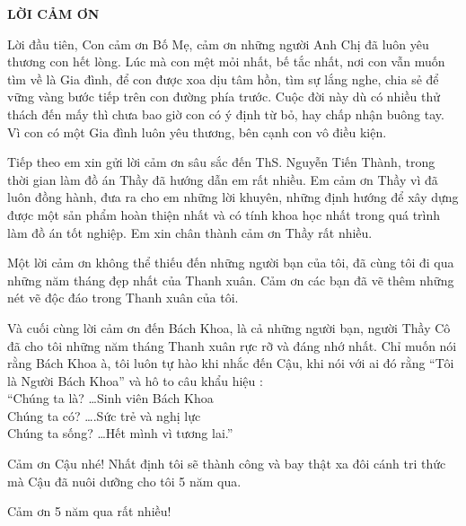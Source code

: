 \documentclass[../DoAn.tex]{subfiles}
\begin{document}
\begin{center}
    \Large{\textbf{LỜI CẢM ƠN}}\\
\end{center}
\vspace{1cm}
Lời đầu tiên, Con cảm ơn Bố Mẹ, cảm ơn những người Anh Chị đã luôn yêu thương con hết lòng. Lúc mà con mệt mỏi nhất, bế tắc nhất, nơi con vẫn muốn tìm về là Gia đình, để con được xoa dịu tâm hồn, tìm sự lắng nghe, chia sẻ để vững vàng bước tiếp trên con đường phía trước. Cuộc đời này dù có nhiều thử thách đến mấy thì chưa bao giờ con có ý định từ bỏ, hay chấp nhận buông tay. Vì con có một Gia đình luôn yêu thương, bên cạnh con vô điều kiện.

Tiếp theo em xin gửi lời cảm ơn sâu sắc đến ThS. Nguyễn Tiến Thành, trong thời gian làm đồ án Thầy đã hướng dẫn em rất nhiều. Em cảm ơn Thầy vì đã luôn đồng hành, đưa ra cho em những lời khuyên, những định hướng để xây dựng được một sản phẩm hoàn thiện nhất và có tính khoa học nhất trong quá trình làm đồ án tốt nghiệp. Em xin chân thành cảm ơn Thầy rất nhiều.

Một lời cảm ơn không thể thiếu đến những người bạn của tôi, đã cùng tôi đi qua những năm tháng đẹp nhất của Thanh xuân. Cảm ơn các bạn đã vẽ thêm những nét vẽ độc đáo trong Thanh xuân của tôi.

Và cuối cùng lời cảm ơn đến Bách Khoa, là cả những người bạn, người Thầy Cô đã cho tôi những năm tháng Thanh xuân rực rỡ và đáng nhớ nhất. Chỉ muốn nói rằng Bách Khoa à, tôi luôn tự hào khi nhắc đến Cậu, khi nói với ai đó rằng “Tôi là Người Bách Khoa” và hô to câu khẩu hiệu :\\
“Chúng ta là? …Sinh viên Bách Khoa\\
Chúng ta có? ….Sức trẻ và nghị lực\\
Chúng ta sống? …Hết mình vì tương lai.”

Cảm ơn Cậu nhé! Nhất định tôi sẽ thành công và bay thật xa đôi cánh tri thức mà Cậu đã nuôi dưỡng cho tôi 5 năm qua. 

Cảm ơn 5 năm qua rất nhiều!
\end{document}
